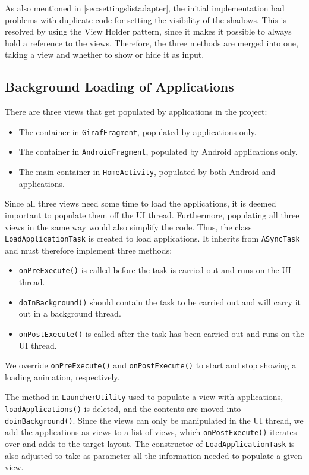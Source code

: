 As also mentioned in \cref{sec:settingslistadapter}, the initial implementation had problems with duplicate code for setting the visibility of the shadows.
This is resolved by using the View Holder pattern, since it makes it possible to always hold a reference to the views. 
Therefore, the three methods are merged into one, taking a view and whether to show or hide it as input.

\subsection{Background Loading of Applications}\label{sec:sprint4:dev:loadapplicationtask}
There are three views that get populated by applications in the \launcher project:

\begin{itemize}
\item The container in \lstinline!GirafFragment!, populated by \giraf applications only.
\item The container in \lstinline!AndroidFragment!, populated by Android applications only.
\item The main container in \lstinline!HomeActivity!, populated by both Android and \giraf applications.
\end{itemize}

Since all three views need some time to load the applications, it is deemed important to populate them off the UI thread.
Furthermore, populating all three views in the same way would also simplify the code.
Thus, the class \lstinline!LoadApplicationTask! is created to load applications. 
It inherits from \lstinline!ASyncTask! and must therefore implement three methods:

\begin{itemize}
\item \lstinline!onPreExecute()! is called before the task is carried out and runs on the UI thread.
\item \lstinline!doInBackground()! should contain the task to be carried out and will carry it out in a background thread.
\item \lstinline!onPostExecute()! is called after the task has been carried out and runs on the UI thread.
\end{itemize}

We override \lstinline!onPreExecute()! and \lstinline!onPostExecute()! to start and stop showing a loading animation, respectively.

The method in \lstinline!LauncherUtility! used to populate a view with applications, \lstinline!loadApplications()! is deleted, and the contents are moved into \lstinline!doinBackground()!.
Since the views can only be manipulated in the UI thread, we add the applications as views to a list of views, which \lstinline!onPostExecute()! iterates over and adds to the target layout. 
The constructor of \lstinline!LoadApplicationTask! is also adjusted to take as parameter all the information needed to populate a given view.

